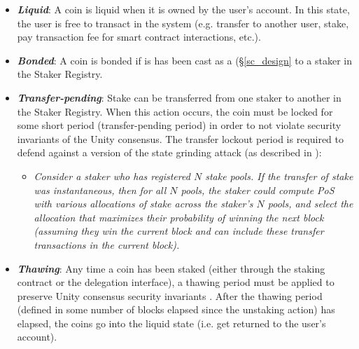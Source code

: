 \begin{itemize}
    \item \textbf{\textit{Liquid}}: A coin is liquid when it is owned by the user's account. In this state, the user is free to transact in the system (e.g. transfer to another user, stake, pay transaction fee for smart contract interactions, etc.).
    \item \textbf{\textit{Bonded}}: A coin is bonded if is has been cast as a  (\S\ref{sc_design} to a staker in the Staker Registry. 
    \item \textbf{\textit{Transfer-pending}}: Stake can be transferred from one staker to another in the Staker Registry. When this action occurs, the coin must be locked for some short period (transfer-pending period) in order to not violate security invariants of the Unity consensus. The transfer lockout period is required to defend against a version of the state grinding attack (as described in \cite{WZS19}): 
    \begin{itemize} [label=,nosep]
        \item \textit{Consider a staker who has registered $N$ stake pools. If the transfer of stake was instantaneous, then for all $N$ pools, the staker could compute PoS  with various allocations of stake across the staker's $N$ pools, and select the allocation that maximizes their probability of winning the next block (assuming they win the current block and can include these transfer transactions in the current block).}  
    \end{itemize}
    \item \textbf{\textit{Thawing}}: Any time a coin has been staked (either through the staking contract or the delegation interface), a thawing period must be applied to preserve Unity consensus security invariants \cite{WZS19}. After the thawing period (defined in some number of blocks elapsed since the unstaking action) has elapsed, the coins go into the liquid state (i.e. get returned to the user's account). 
\end{itemize}


